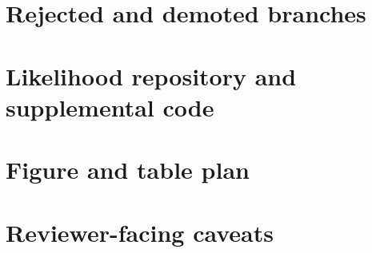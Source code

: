 \documentclass[11pt]{article}
\begin{document}
\section{Rejected and demoted branches}

\section{Likelihood repository and supplemental code}

\section{Figure and table plan}

\section{Reviewer-facing caveats}



\end{document}
